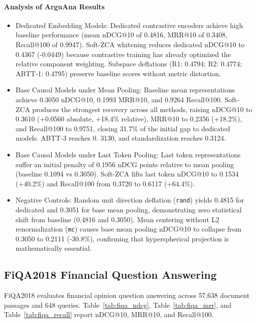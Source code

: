 \paragraph{Analysis of ArguAna Results}
\begin{itemize}
\item Dedicated Embedding Models: Dedicated contrastive encoders achieve high baseline performance (mean nDCG@10 of 0.4816, MRR@10 of 0.3408, Recall@100 of 0.9947). Soft-ZCA whitening reduces dedicated nDCG@10 to 0.4367 (-0.0449) because contrastive training has already optimized the relative component weighting. Subspace deflations (R1: 0.4794; R2: 0.4774; ABTT-1: 0.4795) preserve baseline scores without metric distortion.
\item Base Causal Models under Mean Pooling: Baseline mean representations achieve 0.3050 nDCG@10, 0.1993 MRR@10, and 0.9264 Recall@100. Soft-ZCA produces the strongest recovery across all methods, raising nDCG@10 to 0.3610 (+0.0560 absolute, +18.4\% relative), MRR@10 to 0.2356 (+18.2\%), and Recall@100 to 0.9751, closing 31.7\% of the initial gap to dedicated models. ABTT-3 reaches 0. 3130, and standardization reaches 0.3124.
\item Base Causal Models under Last Token Pooling: Last token representations suffer an initial penalty of 0.1956 nDCG points relative to mean pooling (baseline 0.1094 vs 0.3050). Soft-ZCA lifts last token nDCG@10 to 0.1534 (+40.2\%) and Recall@100 from 0.3720 to 0.6117 (+64.4\%).
\item Negative Controls: Random unit direction deflation (\texttt{rand}) yields 0.4815 for dedicated and 0.3051 for base mean pooling, demonstrating zero statistical shift from baseline (0.4816 and 0.3050). Mean centering without L2 renormalization (\texttt{mc}) causes base mean pooling nDCG@10 to collapse from 0.3050 to 0.2111 (-30.8\%), confirming that hyperspherical projection is mathematically essential.
\end{itemize}


\subsection{FiQA2018 Financial Question Answering}
FiQA2018 evaluates financial opinion question answering across 57,638 document passages and 648 queries. Table~\ref{tab:fiqa_ndcg}, Table~\ref{tab:fiqa_mrr}, and Table~\ref{tab:fiqa_recall} report nDCG@10, MRR@10, and Recall@100.





